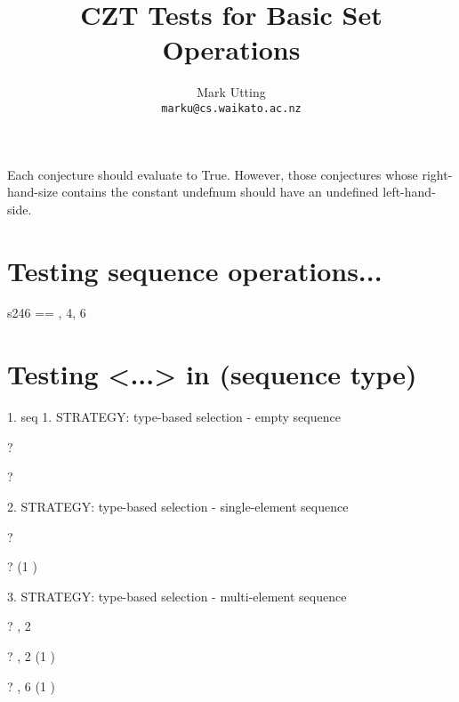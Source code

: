 \documentclass{article}
\title{CZT Tests for Basic Set Operations}
\author{Mark Utting \\ \texttt{marku@cs.waikato.ac.nz}}
\begin{document}
\maketitle

Each conjecture should evaluate to True.
However, those conjectures whose right-hand-size contains
the constant undefnum should have an undefined left-hand-side.


\section{Testing sequence operations...}

\begin{zed}
   s246 == , 4, 6 \rangle
\end{zed}

\section{Testing <...> in (sequence type)}
 1. seq
     1. STRATEGY: type-based selection - empty sequence 
\begin{zed} \vdash? \langle \rangle \in \seq \nat \end{zed}
\begin{zed} \vdash? \langle \rangle \in \seq \langle \rangle \end{zed}
     2. STRATEGY: type-based selection - single-element sequence
\begin{zed} \vdash?  \rangle \in \seq \nat \end{zed}
\begin{zed} \vdash?  \rangle \in \seq (1 ) \end{zed}
     3. STRATEGY: type-based selection - multi-element sequence
\begin{zed} \vdash? , 2 \rangle \in \seq \nat \end{zed}
\begin{zed} \vdash? , 2 \rangle \in \seq (1 ) \end{zed}
\begin{zed} \vdash? , 6 \rangle \notin \seq (1 ) \end{zed}
\end{document}

